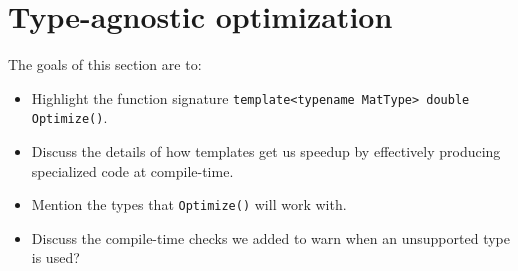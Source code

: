 \section{Type-agnostic optimization}
\label{sec:templated_optimize}



The goals of this section are to:

\begin{itemize}
  \item Highlight the function signature {\tt template<typename MatType> double
Optimize()}.

  \item Discuss the details of how templates get us speedup by effectively
producing specialized code at compile-time.

  \item Mention the types that {\tt Optimize()} will work with.

  \item Discuss the compile-time checks we added to warn when an unsupported
type is used?
\end{itemize}
